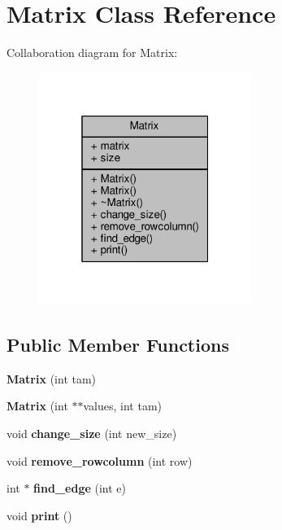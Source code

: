 \hypertarget{class_matrix}{\section{Matrix Class Reference}
\label{class_matrix}
}


Collaboration diagram for Matrix\+:
\nopagebreak
\begin{figure}[H]
\begin{center}
\leavevmode
\includegraphics[width=196pt]{class_matrix__coll__graph}
\end{center}
\end{figure}
\subsection*{Public Member Functions}
\begin{DoxyCompactItemize}
\item 
\hypertarget{class_matrix_ae763d5a5d65e3c0f185bebd7766124ba}{{\bfseries Matrix} (int tam)}\label{class_matrix_ae763d5a5d65e3c0f185bebd7766124ba}

\item 
\hypertarget{class_matrix_ae1235f5c15ae98654e92ea2661ca60ea}{{\bfseries Matrix} (int $\ast$$\ast$values, int tam)}\label{class_matrix_ae1235f5c15ae98654e92ea2661ca60ea}

\item 
\hypertarget{class_matrix_a1e9a500f0ca4e681153fee9b2727b836}{void {\bfseries change\+\_\+size} (int new\+\_\+size)}\label{class_matrix_a1e9a500f0ca4e681153fee9b2727b836}

\item 
\hypertarget{class_matrix_a8360b94a374a116db0cc9163467ac4d7}{void {\bfseries remove\+\_\+rowcolumn} (int row)}\label{class_matrix_a8360b94a374a116db0cc9163467ac4d7}

\item 
\hypertarget{class_matrix_a63682775de6a8d35bc89cabbc35e2d61}{int $\ast$ {\bfseries find\+\_\+edge} (int e)}\label{class_matrix_a63682775de6a8d35bc89cabbc35e2d61}

\item 
\hypertarget{class_matrix_a99ba97122b8fdd54e95290caf80fc8e2}{void {\bfseries print} ()}\label{class_matrix_a99ba97122b8fdd54e95290caf80fc8e2}

\end{DoxyCompactItemize}
